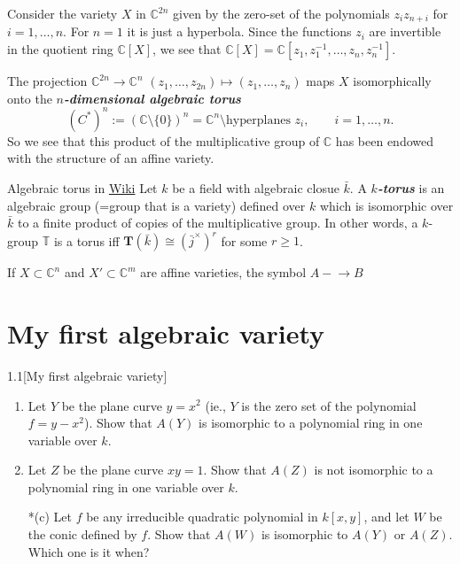 \begin{example}\leavevmode
	Consider the variety $X$ in $\mathbb{C}^{2n}$ given by the zero-set of the polynomials $z_iz_{n+i}$ for $i=1,\ldots,n$. For $n=1$ it is just a hyperbola. Since the functions  $z_i$ are invertible in the quotient ring $\mathbb{C}[X]$, we see that $\mathbb{C}[X]=\mathbb{C}[z_1,z_1^{-1},\ldots,z_n,z_n^{-1}]$.

	The projection $\mathbb{C}^{2n}\longrightarrow \mathbb{C}^n$ $(z_1,\ldots,z_{2n})\longmapsto(z_1,\ldots,z_n)$ maps $X$ isomorphically onto the \textit{\textbf{$n$-dimensional algebraic torus}} 
	\[(C^* )^n:=(\mathbb{C}\setminus \{0\} )^n=\mathbb{C}^{n}\setminus \text{hyperplanes } z_i,\qquad i=1,\ldots,n.\]
	So we see that this product of the multiplicative group of $\mathbb{C}$ has been endowed with the structure of an affine variety.

	\begin{thing2}{Algebraic torus in \href{https://en.wikipedia.org/wiki/Algebraic_torus}{Wiki}}\leavevmode
		Let $k$ be a field with algebraic closue  $\bar{k}$. A \textit{\textbf{$k$-torus}} is an algebraic group (=group that is a variety) defined over $k$ which is isomorphic over $\bar{k}$ to a finite product of copies of the multiplicative group. In other words, a $k$-group $\mathbb{T}$ is a torus iff $\mathbf{T}(\bar{k})\cong (\bar{j}^\times )^r$ for some $r\geq 1$.
	\end{thing2}
\end{example}

If $X\subset \mathbb{C}^{n}$ and $X'\subset \mathbb{C}^{m}$ are affine varieties, the symbol $A-\!\! \rightarrow B$




\section{My first algebraic variety}

\begin{manualexercise}{1.1}[My first algebraic variety]
	\begin{enumerate}[label*=(\alph*)]\leavevmode
		\item Let $Y$ be the plane curve $y=x^2$ (ie., $Y$ is the zero set of the polynomial $f=y-x^2$). Show that $A(Y)$ is isomorphic to a polynomial ring in one variable over $k$.
		\item Let $Z$ be the plane curve $xy=1$. Show that $A(Z)$ is not isomorphic to a polynomial ring in one variable over $k$.
		\item[*(c)] Let $f$ be any irreducible quadratic polynomial in $k[x,y]$, and let $W$ be the conic defined by $f$. Show that $A(W)$ is isomorphic to $A(Y)$ or $A(Z)$. Which one is it when?
	\end{enumerate}
\end{manualexercise}

